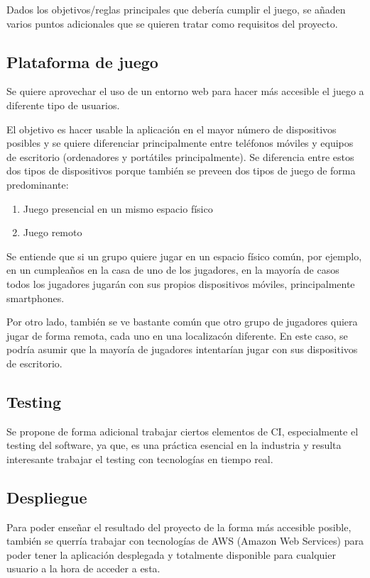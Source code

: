 Dados los objetivos/reglas principales que debería cumplir el juego, se añaden varios puntos adicionales que se quieren
tratar como requisitos del proyecto.

\subsection{Plataforma de juego}

Se quiere aprovechar el uso de un entorno web para hacer más accesible el juego a diferente tipo de usuarios.

El objetivo es hacer usable la aplicación en el mayor número de dispositivos posibles y se quiere diferenciar principalmente entre
teléfonos móviles y equipos de escritorio (ordenadores y portátiles principalmente). Se diferencia entre estos dos tipos de
dispositivos porque también se preveen dos tipos de juego de forma predominante:

\begin{enumerate}
    \item Juego presencial en un mismo espacio físico
    \item Juego remoto
\end{enumerate}

Se entiende que si un grupo quiere jugar en un espacio físico común, por ejemplo, en un cumpleaños en la casa de uno de los
jugadores, en la mayoría de casos todos los jugadores jugarán con sus propios dispositivos móviles, principalmente smartphones.

Por otro lado, también se ve bastante común que otro grupo de jugadores quiera jugar de forma remota, cada uno en una
localizacón diferente. En este caso, se podría asumir que la mayoría de jugadores intentarían jugar con sus dispositivos de
escritorio.

\subsection{Testing}

Se propone de forma adicional trabajar ciertos elementos de CI, especialmente el testing del software, ya que, es una práctica
esencial en la industria y resulta interesante trabajar el testing con tecnologías en tiempo real.

\subsection{Despliegue}

Para poder enseñar el resultado del proyecto de la forma más accesible posible, también se querría trabajar con tecnologías de
AWS (Amazon Web Services) para poder tener la aplicación desplegada y totalmente disponible para cualquier usuario a la hora
de acceder a esta.

